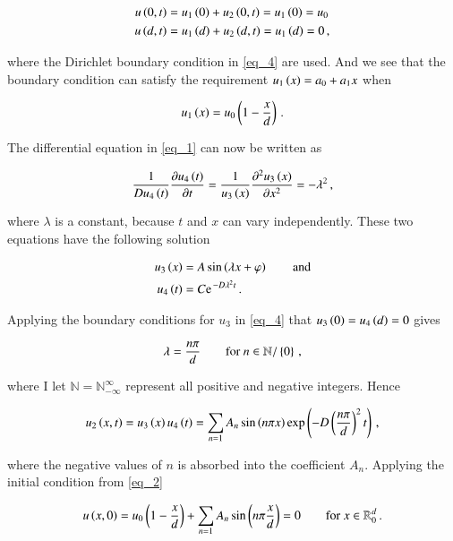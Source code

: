 \documentclass[11pt,english,a4paper]{article}
\begin{document}
\begin{flushleft}
\begin{align*}
u\left({0,t}\right) &= u_1\left({0}\right) + u_2\left({0,t}\right) = u_1\left({0}\right) = u_0
\\
u\left({d,t}\right) &= u_1\left({d}\right) + u_2\left({d,t}\right) = u_1\left({d}\right) = 0\,,
\end{align*}

where the Dirichlet boundary condition in \eqref{eq_4} are used. And we see that the boundary condition can satisfy the requirement $u_1\left({x}\right) = a_0 + a_1 x$ when

\begin{align}
u_1\left({x}\right) = u_0\left({1-\frac{x}{d}}\right)\,.
\label{eq_5}
\end{align} 

The differential equation in \eqref{eq_1} can now be written as

\begin{align*}
\frac{1}{Du_4\left({t}\right)} \frac{\partial u_4\left({t}\right)}{\partial t} = \frac{1}{u_3\left({x}\right)}\frac{\partial^2 u_3\left({x}\right)}{\partial x^2} = -\lambda^2 \,,
\end{align*}

where $\lambda$ is a constant, because $t$ and $x$ can vary independently. These two equations have the following solution

\begin{align*}
u_3\p{x} &= A\sin\p{\lambda x + \varphi} \qquad \text{and}
\\
u_4\p{t} &= C\e^{-D\lambda^2 t}\,.
\end{align*}

Applying the boundary conditions for $u_3$ in \eqref{eq_4} that $u_3\left({0}\right)=u_4\left({d}\right)=0$ gives

\begin{align*}
\lambda = \frac{n\pi}{d} \qquad \text{for } n \in \mathbb{N}/\left\lbrace{0}\right\rbrace\,,
\end{align*}

where I let $\mathbb{N}=\mathbb{N}_{-\infty}^{\infty}$ represent all positive and negative integers. Hence

\begin{align*}
u_2\left({x,t}\right) = u_3\left({x}\right)u_4\left({t}\right) = \sum_{n=1} A_n \sin\left({n\pi x}\right) \exp\left({-D\left({\frac{n \pi}{d}}\right)^2 t}\right)\,,
\end{align*}

where the negative values of $n$ is absorbed into the coefficient $A_n$. Applying the initial condition from \eqref{eq_2}

\begin{align}
u\left({x,0}\right) = u_0\left({1-\frac{x}{d}}\right) + \sum_{n=1} A_n \sin\left({n\pi \frac{x}{d}}\right) = 0 \qquad \text{for } x\in\mathbb{R}_0^d\,.
\label{eq_6}
\end{align}


\end{flushleft}
\end{document}
